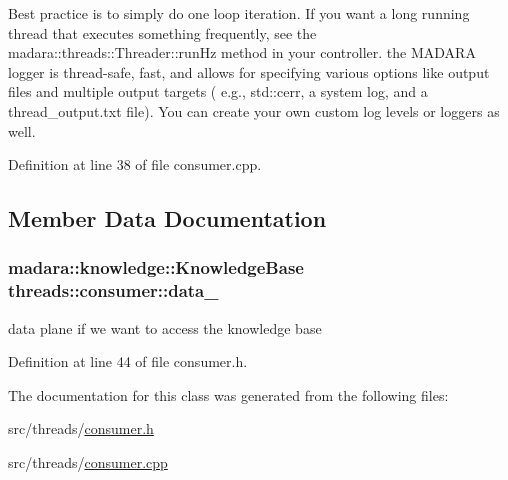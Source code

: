 Best practice is to simply do one loop iteration. If you want a long running thread that executes something frequently, see the madara\+::threads\+::\+Threader\+::run\+Hz method in your controller. the M\+A\+D\+A\+RA logger is thread-\/safe, fast, and allows for specifying various options like output files and multiple output targets ( e.\+g., std\+::cerr, a system log, and a thread\+\_\+output.\+txt file). You can create your own custom log levels or loggers as well.

Definition at line 38 of file consumer.\+cpp.



\subsection{Member Data Documentation}
\subsubsection[{\texorpdfstring{data\+\_\+}{data_}}]{\setlength{\rightskip}{0pt plus 5cm}madara\+::knowledge\+::\+Knowledge\+Base threads\+::consumer\+::data\+\_\+\hspace{0.3cm}{\ttfamily [private]}}\hypertarget{classthreads_1_1consumer_ad2ecf700b19fbc6c17f3de8b2e45f39a}{}\label{classthreads_1_1consumer_ad2ecf700b19fbc6c17f3de8b2e45f39a}


data plane if we want to access the knowledge base 



Definition at line 44 of file consumer.\+h.



The documentation for this class was generated from the following files\+:\begin{DoxyCompactItemize}
\item 
src/threads/\hyperlink{consumer_8h}{consumer.\+h}\item 
src/threads/\hyperlink{consumer_8cpp}{consumer.\+cpp}\end{DoxyCompactItemize}
